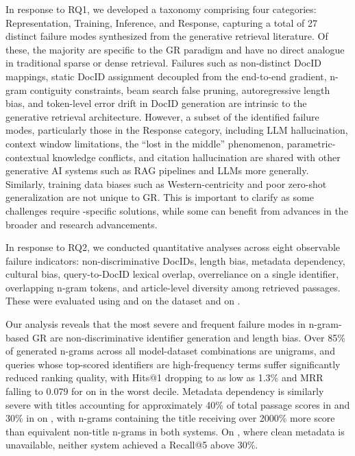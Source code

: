 In response to RQ1, we developed a taxonomy comprising four categories: Representation, Training, Inference, and Response, capturing a total of 27 distinct failure modes synthesized from the generative retrieval literature. Of these, the majority are specific to the GR paradigm and have no direct analogue in traditional sparse or dense retrieval. Failures such as non-distinct DocID mappings, static DocID assignment decoupled from the end-to-end gradient, n-gram contiguity constraints, beam search false pruning, autoregressive length bias, and token-level error drift in DocID generation are intrinsic to the generative retrieval architecture. However, a subset of the identified failure modes, particularly those in the Response category, including LLM hallucination, context window limitations, the ``lost in the middle'' phenomenon, parametric-contextual knowledge conflicts, and citation hallucination are shared with other generative AI systems such as RAG pipelines and LLMs more generally. Similarly, training data biases such as Western-centricity and poor zero-shot generalization are not unique to GR. This is important to clarify as some challenges require -specific solutions, while some can benefit from advances in the broader  and  research advancements.

In response to RQ2, we conducted quantitative analyses across eight observable failure indicators: non-discriminative DocIDs, length bias, metadata dependency, cultural bias, query-to-DocID lexical overlap, overreliance on a single identifier, overlapping n-gram tokens, and article-level diversity among retrieved passages. These were evaluated using  and  on the  dataset and  on .

Our analysis reveals that the most severe and frequent failure modes in n-gram-based GR are non-discriminative identifier generation and length bias. Over 85\% of generated n-grams across all model-dataset combinations are unigrams, and queries whose top-scored identifiers are high-frequency terms suffer significantly reduced ranking quality, with Hits@1 dropping to as low as 1.3\% and MRR falling to 0.079 for  on  in the worst decile. Metadata dependency is similarly severe with titles accounting for approximately 40\% of total passage scores in  and 30\% in  on , with n-grams containing the title receiving over 2000\% more score than equivalent non-title n-grams in both systems. On , where clean metadata is unavailable, neither system achieved a Recall@5 above 30\%.

